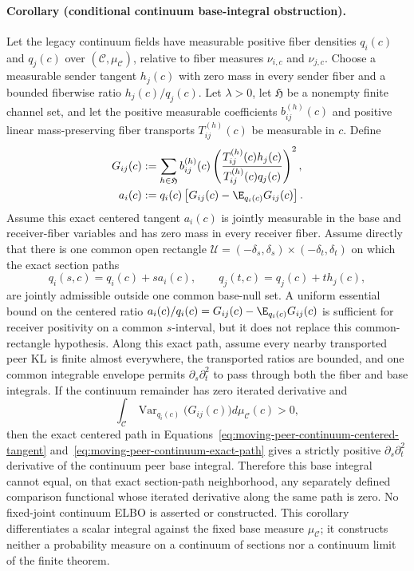 \paragraph{Corollary (conditional continuum base-integral obstruction).}
Let the legacy continuum fields have measurable positive fiber densities \(q_i(c)\) and \(q_j(c)\) over \((\mathcal C,\mu_{\mathcal C})\), relative to fiber measures \(\nu_{i,c}\) and \(\nu_{j,c}\). Choose a measurable sender tangent \(h_j(c)\) with zero mass in every sender fiber and a bounded fiberwise ratio \(h_j(c)/q_j(c)\). Let \(\lambda>0\), let \(\mathfrak H\) be a nonempty finite channel set, and let the positive measurable coefficients \(b_{ij}^{(h)}(c)\) and positive linear mass-preserving fiber transports \(T_{ij}^{(h)}(c)\) be measurable in \(c\). Define
\begin{align}
G_{ij}(c)
&:=\sum_{h\in\mathfrak H}b_{ij}^{(h)}(c)
\left(
\frac{T_{ij}^{(h)}(c)h_j(c)}
{T_{ij}^{(h)}(c)q_j(c)}
\right)^2,
\label{eq:moving-peer-continuum-aggregate}\\
a_i(c)
&:=q_i(c)\left[
G_{ij}(c)-\E_{q_i(c)}G_{ij}(c)
\right].
\label{eq:moving-peer-continuum-centered-tangent}
\end{align}
Assume this exact centered tangent \(a_i(c)\) is jointly measurable in the base and receiver-fiber variables and has zero mass in every receiver fiber. Assume directly that there is one common open rectangle \(\mathcal U=(-\delta_s,\delta_s)\times(-\delta_t,\delta_t)\) on which the exact section paths
\begin{equation}
q_i(s,c)=q_i(c)+s a_i(c),
\qquad
q_j(t,c)=q_j(c)+t h_j(c),
\label{eq:moving-peer-continuum-exact-path}
\end{equation}
are jointly admissible outside one common base-null set. A uniform essential bound on the centered ratio \(a_i(c)/q_i(c)=G_{ij}(c)-\E_{q_i(c)}G_{ij}(c)\) is sufficient for receiver positivity on a common \(s\)-interval, but it does not replace this common-rectangle hypothesis. Along this exact path, assume every nearby transported peer KL is finite almost everywhere, the transported ratios are bounded, and one common integrable envelope permits \(\partial_s\partial_t^2\) to pass through both the fiber and base integrals. If the continuum remainder has zero iterated derivative and
\begin{equation}
\int_{\mathcal C}
\operatorname{Var}_{q_i(c)}\bigl(G_{ij}(c)\bigr)
d\mu_{\mathcal C}(c)>0,
\label{eq:moving-peer-continuum-positive-variance}
\end{equation}
then the exact centered path in Equations~\eqref{eq:moving-peer-continuum-centered-tangent} and~\eqref{eq:moving-peer-continuum-exact-path} gives a strictly positive \(\partial_s\partial_t^2\) derivative of the continuum peer base integral. Therefore this base integral cannot equal, on that exact section-path neighborhood, any separately defined comparison functional whose iterated derivative along the same path is zero. No fixed-joint continuum ELBO is asserted or constructed. This corollary differentiates a scalar integral against the fixed base measure \(\mu_{\mathcal C}\); it constructs neither a probability measure on a continuum of sections nor a continuum limit of the finite theorem.

